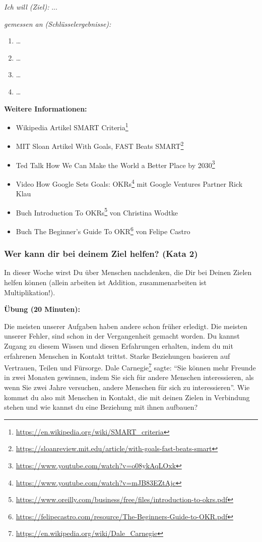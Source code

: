 \documentclass[
  ngerman,
  paper=a4,
,captions=tableheading
]{scrartcl}
\DeclareRobustCommand{\href}[2]{#2\footnote{\url{#1}}}
\providecommand{\tightlist}{%
  \setlength{\itemsep}{0pt}\setlength{\parskip}{0pt}}
\begin{document}
\emph{Ich will (Ziel):} ...

\emph{gemessen an (Schlüsselergebnisse):}

\begin{enumerate}
\def\labelenumi{\arabic{enumi}.}
\tightlist
\item
  \ldots{}
\item
  \ldots{}
\item
  \ldots{}
\item
  \ldots{}
\end{enumerate}

\textbf{Weitere Informationen:}

\begin{itemize}
\tightlist
\item
  Wikipedia Artikel
  \href{https://en.wikipedia.org/wiki/SMART_criteria}{SMART Criteria}
\item
  MIT Sloan Artikel
  \href{https://sloanreview.mit.edu/article/with-goals-fast-beats-smart}{With
  Goals, FAST Beats SMART}
\item
  Ted Talk \href{https://www.youtube.com/watch?v=o08ykAqLOxk}{How We Can
  Make the World a Better Place by 2030}
\item
  Video \href{https://www.youtube.com/watch?v=mJB83EZtAjc}{How Google
  Sets Goals: OKRs} mit Google Ventures Partner Rick Klau
\item
  Buch
  \href{https://www.oreilly.com/business/free/files/introduction-to-okrs.pdf}{Introduction
  To OKRs} von Christina Wodtke
\item
  Buch
  \href{https://felipecastro.com/resource/The-Beginners-Guide-to-OKR.pdf}{The
  Beginner's Guide To OKR} von Felipe Castro
\end{itemize}

\hypertarget{wer-kann-dir-bei-deinem-ziel-helfen-kata-2}{%
\subsubsection{Wer kann dir bei deinem Ziel helfen? (Kata
2)}\label{wer-kann-dir-bei-deinem-ziel-helfen-kata-2}}

In dieser Woche wirst Du über Menschen nachdenken, die Dir bei Deinen
Zielen helfen können (allein arbeiten ist Addition, zusammenarbeiten ist
Multiplikation!).

\textbf{Übung (20 Minuten):}

Die meisten unserer Aufgaben haben andere schon früher erledigt. Die
meisten unserer Fehler, sind schon in der Vergangenheit gemacht worden.
Du kannst Zugang zu diesem Wissen und diesen Erfahrungen erhalten, indem
du mit erfahrenen Menschen in Kontakt trittst. Starke Beziehungen
basieren auf Vertrauen, Teilen und Fürsorge.
\href{https://en.wikipedia.org/wiki/Dale_Carnegie}{Dale Carnegie} sagte:
``Sie können mehr Freunde in zwei Monaten gewinnen, indem Sie sich für
andere Menschen interessieren, als wenn Sie zwei Jahre versuchen, andere
Menschen für sich zu interessieren''. Wie kommst du also mit Menschen in
Kontakt, die mit deinen Zielen in Verbindung stehen und wie kannst du
eine Beziehung mit ihnen aufbauen?
\end{document}

